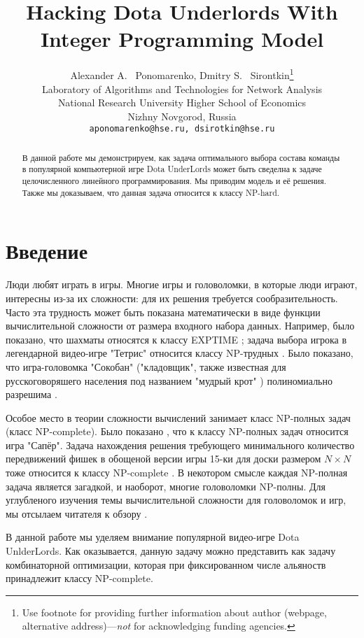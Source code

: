 \documentclass{article}
\title{Hacking Dota Underlords With Integer Programming Model}
\author{
  Alexander A. ~Ponomarenko, Dmitry S. ~Sirontkin\thanks{Use footnote for providing further
    information about author (webpage, alternative
    address)---\emph{not} for acknowledging funding agencies.} \\
  Laboratory of Algorithms and Technologies for Network Analysis\\
  National Research University Higher School of Economics \\
  Nizhny Novgorod, Russia\\
  \texttt{aponomarenko@hse.ru, dsirotkin@hse.ru} \\
}
\begin{document}
\maketitle

\begin{abstract}
В данной работе мы демонстрируем, как задача оптимального выбора состава команды в популярной компьютерной игре Dota UnderLords может быть сведелна к задаче целочисленного линейного программирования. Мы приводим модель и её решения. Также мы доказываем, что данная задача относится к классу NP-hard. 
\end{abstract}




\section{Введение}

Люди любят играть в игры. Многие игры и головоломки, в которые люди играют, интересны из-за их сложности: для их решения требуется сообразительность. Часто эта трудность может быть показана математически в виде функции вычислительной сложности от размера входного набора данных. Например, было показано, что шахматы относятся к классу EXPTIME \cite{fraenkel1981computing}; задача выбора игрока  в легендарной видео-игре "Тетрис" относится классу NP-трудных \cite{breukelaar2004tetris}. Было показано, что игра-головомка "Сокобан" ("кладовщик", также известная для русскоговоряшего населения под названием "мудрый крот" ) полиномиально разрешима \cite{hearn2005pspace}.

Особое место в теории сложности вычислений занимает класс NP-полных задач (класс NP-complete). %
Было показано  \cite{kaye2000minesweeper}, что к классу NP-полных задач относится игра "Сапёр". Задача нахождения решения требующего минимального количество передвижений фишек в обощеной версии игры 15-ки для доски размером $N \times N$ тоже относится к классу NP-complete \cite{ratner1986finding}. 
В некотором смысле каждая NP-полная задача является загадкой, и наоборот, многие головоломки NP-полны. Для углубленого изучения темы вычислительной сложности для головоломок и игр, мы отсылаем читателя к обзору  \cite{costa2018computational}.

В данной работе мы уделяем внимание популярной видео-игре Dota UnlderLords. 
Как оказывается, данную задачу можно представить как задачу комбинаторной оптимизации, которая при фиксированном числе альяноств принадлежит классу NP-complete.
\end{document}
